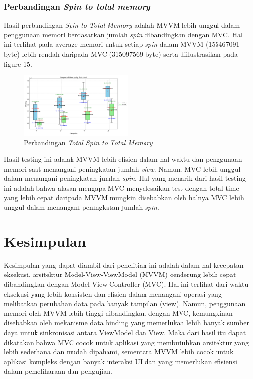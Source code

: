 \documentclass[conference]{IEEEtran}
\begin{document}
	\vspace{3cm}
	
	\subsubsection{Perbandingan \textit{Spin to total memory}}
	Hasil perbandingan \textit{Spin to Total Memory} adalah MVVM lebih unggul dalam penggunaan memori berdasarkan jumlah \textit{spin} dibandingkan dengan MVC. Hal ini terlihat pada average memori untuk setiap \textit{spin} dalam MVVM (155467091 byte) lebih rendah daripada MVC (315097569 byte) serta diilustrasikan pada figure 15.
	
	\begin{figure}[h]
		\centering
		\includegraphics[width=0.5\textwidth]{../mvc-mvvm/plot_spin_total_memory.pdf}
		\caption{Perbandingan \textit{Total Spin to Total Memory}}
		\label{fig:total_spin_to_total_memory}
	\end{figure}
	
	Hasil testing ini adalah MVVM lebih efisien dalam hal waktu dan penggunaan memori saat menangani peningkatan jumlah \textit{view}. Namun, MVC lebih unggul dalam menangani peningkatan jumlah \textit{spin}. Hal yang menarik dari hasil testing ini adalah bahwa alasan mengapa MVC menyelesaikan test dengan total time yang lebih cepat daripada MVVM mungkin disebabkan oleh halnya MVC lebih unggul dalam menangani peningkatan jumlah \textit{spin}.
	
	
	\section{Kesimpulan}
	Kesimpulan yang dapat diambil dari penelitian ini adalah dalam hal kecepatan eksekusi, arsitektur Model-View-ViewModel (MVVM) cenderung lebih cepat dibandingkan dengan Model-View-Controller (MVC). Hal ini terlihat dari waktu eksekusi yang lebih konsisten dan efisien dalam menangani operasi yang melibatkan perubahan data pada banyak tampilan (view). Namun, penggunaan memori oleh MVVM lebih tinggi dibandingkan dengan MVC, kemungkinan disebabkan oleh mekanisme data binding yang memerlukan lebih banyak sumber daya untuk sinkronisasi antara ViewModel dan View. Maka dari hasil itu dapat dikatakan bahwa MVC cocok untuk aplikasi yang membutuhkan arsitektur yang lebih sederhana dan mudah dipahami, sementara MVVM lebih cocok untuk aplikasi kompleks dengan banyak interaksi UI dan yang memerlukan efisiensi dalam pemeliharaan dan pengujian.
	
\end{document}
